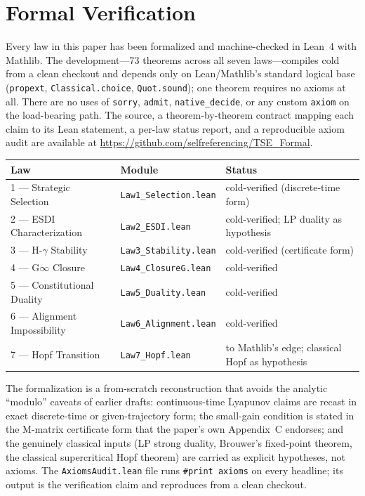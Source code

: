 \documentclass[12pt]{article}
\begin{document}

\section{Formal Verification}
\label{sec:formal-verification}

Every law in this paper has been formalized and machine-checked in Lean~4 with Mathlib. The development---73 theorems across all seven laws---compiles cold from a clean checkout and depends only on Lean/Mathlib's standard logical base (\texttt{propext}, \texttt{Classical.choice}, \texttt{Quot.sound}); one theorem requires no axioms at all. There are no uses of \texttt{sorry}, \texttt{admit}, \texttt{native\_decide}, or any custom \texttt{axiom} on the load-bearing path. The source, a theorem-by-theorem contract mapping each claim to its Lean statement, a per-law status report, and a reproducible axiom audit are available at \url{https://github.com/selfreferencing/TSE_Formal}.

\begin{center}
\begin{tabular}{@{}lll@{}}
\toprule
Law & Module & Status \\
\midrule
1 --- Strategic Selection & \texttt{Law1\_Selection.lean} & cold-verified (discrete-time form) \\
2 --- ESDI Characterization & \texttt{Law2\_ESDI.lean} & cold-verified; LP duality as hypothesis \\
3 --- H-$\gamma$ Stability & \texttt{Law3\_Stability.lean} & cold-verified (certificate form) \\
4 --- G$\infty$ Closure & \texttt{Law4\_ClosureG.lean} & cold-verified \\
5 --- Constitutional Duality & \texttt{Law5\_Duality.lean} & cold-verified \\
6 --- Alignment Impossibility & \texttt{Law6\_Alignment.lean} & cold-verified \\
7 --- Hopf Transition & \texttt{Law7\_Hopf.lean} & to Mathlib's edge; classical Hopf as hypothesis \\
\bottomrule
\end{tabular}
\end{center}

The formalization is a from-scratch reconstruction that avoids the analytic ``modulo'' caveats of earlier drafts: continuous-time Lyapunov claims are recast in exact discrete-time or given-trajectory form; the small-gain condition is stated in the M-matrix certificate form that the paper's own Appendix~C endorses; and the genuinely classical inputs (LP strong duality, Brouwer's fixed-point theorem, the classical supercritical Hopf theorem) are carried as explicit hypotheses, not axioms. The \texttt{AxiomsAudit.lean} file runs \texttt{\#print axioms} on every headline; its output is the verification claim and reproduces from a clean checkout.
\end{document}
